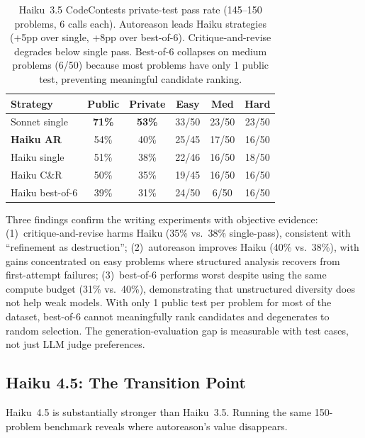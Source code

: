 \documentclass[11pt]{article}
\begin{document}
\begin{table}[H]
\centering
\small
\begin{tabular}{@{}lccccc@{}}
\toprule
\textbf{Strategy} & \textbf{Public} & \textbf{Private} & \textbf{Easy} & \textbf{Med} & \textbf{Hard} \\
\midrule
\rowcolor{TableShade}
Sonnet single & \textbf{71\%} & \textbf{53\%} & 33/50 & 23/50 & 23/50 \\
\textbf{Haiku AR} & 54\% & 40\% & 25/45 & 17/50 & 16/50 \\
\rowcolor{TableShade}
Haiku single & 51\% & 38\% & 22/46 & 16/50 & 18/50 \\
Haiku C\&R & 50\% & 35\% & 19/45 & 16/50 & 16/50 \\
\rowcolor{TableShade}
Haiku best-of-6 & 39\% & 31\% & 24/50 & 6/50 & 16/50 \\
\bottomrule
\end{tabular}
\caption{Haiku~3.5 CodeContests private-test pass rate (145--150 problems, 6 calls each). Autoreason leads Haiku strategies (+5pp over single, +8pp over best-of-6). Critique-and-revise degrades below single pass. Best-of-6 collapses on medium problems (6/50) because most problems have only 1 public test, preventing meaningful candidate ranking.}
\label{tab:haiku_code}
\end{table}

Three findings confirm the writing experiments with objective evidence: (1)~critique-and-revise harms Haiku (35\% vs.\ 38\% single-pass), consistent with ``refinement as destruction''; (2)~autoreason improves Haiku (40\% vs.\ 38\%), with gains concentrated on easy problems where structured analysis recovers from first-attempt failures; (3)~best-of-6 performs worst despite using the same compute budget (31\% vs.\ 40\%), demonstrating that unstructured diversity does not help weak models. With only 1 public test per problem for most of the dataset, best-of-6 cannot meaningfully rank candidates and degenerates to random selection. The generation-evaluation gap is measurable with test cases, not just LLM judge preferences.

\subsection{Haiku 4.5: The Transition Point}

Haiku~4.5 is substantially stronger than Haiku~3.5. Running the same 150-problem benchmark reveals where autoreason's value disappears.
\end{document}
